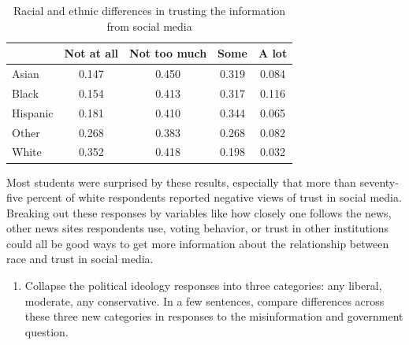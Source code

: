 \documentclass[
  letterpaper,
  DIV=11,
  numbers=noendperiod]{scrartcl}
\newenvironment{Shaded}{\begin{snugshade}}{\end{snugshade}}
\newcommand{\AttributeTok}[1]{\textcolor[rgb]{0.40,0.45,0.13}{#1}}
\newcommand{\ConstantTok}[1]{\textcolor[rgb]{0.56,0.35,0.01}{#1}}
\newcommand{\DecValTok}[1]{\textcolor[rgb]{0.68,0.00,0.00}{#1}}
\newcommand{\FunctionTok}[1]{\textcolor[rgb]{0.28,0.35,0.67}{#1}}
\newcommand{\NormalTok}[1]{\textcolor[rgb]{0.00,0.23,0.31}{#1}}
\newcommand{\SpecialCharTok}[1]{\textcolor[rgb]{0.37,0.37,0.37}{#1}}
\newcommand{\StringTok}[1]{\textcolor[rgb]{0.13,0.47,0.30}{#1}}
\providecommand{\tightlist}{%
  \setlength{\itemsep}{0pt}\setlength{\parskip}{0pt}}\usepackage{longtable,booktabs,array}
\begin{document}
\begin{Shaded}
\end{Shaded}

\begin{table}[!h]

\caption{Racial and ethnic differences in trusting the information from social media}
\centering
\begin{tabular}[t]{lcccc}
\toprule
  & Not at all & Not too much & Some & A lot\\
\midrule
Asian & 0.147 & 0.450 & 0.319 & 0.084\\
Black & 0.154 & 0.413 & 0.317 & 0.116\\
Hispanic & 0.181 & 0.410 & 0.344 & 0.065\\
Other & 0.268 & 0.383 & 0.268 & 0.082\\
White & 0.352 & 0.418 & 0.198 & 0.032\\
\bottomrule
\end{tabular}
\end{table}

Most students were surprised by these results, especially that more than
seventy-five percent of white respondents reported negative views of
trust in social media. Breaking out these responses by variables like
how closely one follows the news, other news sites respondents use,
voting behavior, or trust in other institutions could all be good ways
to get more information about the relationship between race and trust in
social media.

\begin{enumerate}
\def\labelenumi{\arabic{enumi}.}
\setcounter{enumi}{3}
\tightlist
\item
  Collapse the political ideology responses into three categories: any
  liberal, moderate, any conservative. In a few sentences, compare
  differences across these three new categories in responses to the
  misinformation and government question.
\end{enumerate}
\end{document}
